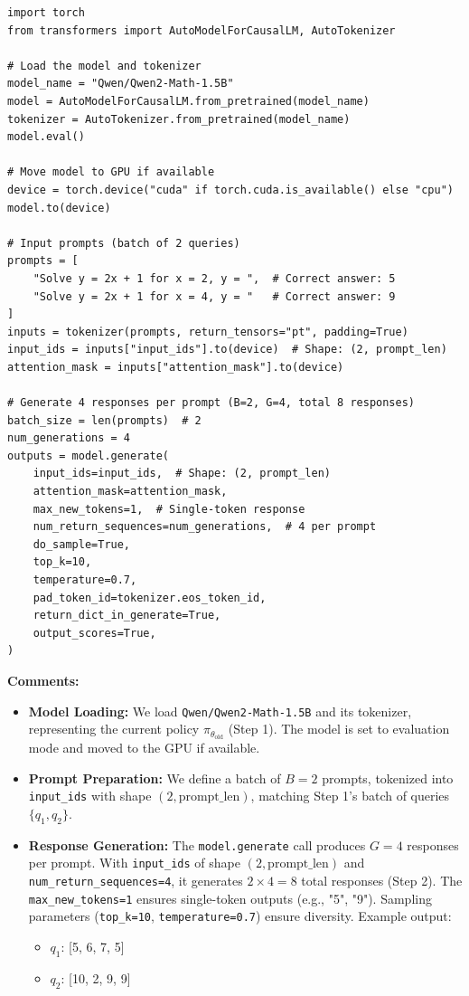 \documentclass{article}
\begin{document}
\begin{verbatim}
import torch
from transformers import AutoModelForCausalLM, AutoTokenizer

# Load the model and tokenizer
model_name = "Qwen/Qwen2-Math-1.5B"
model = AutoModelForCausalLM.from_pretrained(model_name)
tokenizer = AutoTokenizer.from_pretrained(model_name)
model.eval()

# Move model to GPU if available
device = torch.device("cuda" if torch.cuda.is_available() else "cpu")
model.to(device)

# Input prompts (batch of 2 queries)
prompts = [
    "Solve y = 2x + 1 for x = 2, y = ",  # Correct answer: 5
    "Solve y = 2x + 1 for x = 4, y = "   # Correct answer: 9
]
inputs = tokenizer(prompts, return_tensors="pt", padding=True)
input_ids = inputs["input_ids"].to(device)  # Shape: (2, prompt_len)
attention_mask = inputs["attention_mask"].to(device)

# Generate 4 responses per prompt (B=2, G=4, total 8 responses)
batch_size = len(prompts)  # 2
num_generations = 4
outputs = model.generate(
    input_ids=input_ids,  # Shape: (2, prompt_len)
    attention_mask=attention_mask,
    max_new_tokens=1,  # Single-token response
    num_return_sequences=num_generations,  # 4 per prompt
    do_sample=True,
    top_k=10,
    temperature=0.7,
    pad_token_id=tokenizer.eos_token_id,
    return_dict_in_generate=True,
    output_scores=True,
)
\end{verbatim}

\textbf{Comments:}
\begin{itemize}
  \item \textbf{Model Loading:} We load \texttt{Qwen/Qwen2-Math-1.5B} and its tokenizer, representing the current policy \( \pi_{\theta_{\text{old}}} \) (Step 1). The model is set to evaluation mode and moved to the GPU if available.
  \item \textbf{Prompt Preparation:} We define a batch of \( B = 2 \) prompts, tokenized into \texttt{input\_ids} with shape \( (2, \text{prompt\_len}) \), matching Step 1’s batch of queries \( \{q_1, q_2\} \).
  \item \textbf{Response Generation:} The \texttt{model.generate} call produces \( G = 4 \) responses per prompt. With \texttt{input\_ids} of shape \( (2, \text{prompt\_len}) \) and \texttt{num\_return\_sequences=4}, it generates \( 2 \times 4 = 8 \) total responses (Step 2). The \texttt{max\_new\_tokens=1} ensures single-token outputs (e.g., "5", "9"). Sampling parameters (\texttt{top\_k=10}, \texttt{temperature=0.7}) ensure diversity. Example output:
  \begin{itemize}
    \item \( q_1 \): [5, 6, 7, 5]
    \item \( q_2 \): [10, 2, 9, 9]
  \end{itemize}
\end{itemize}
\end{document}
